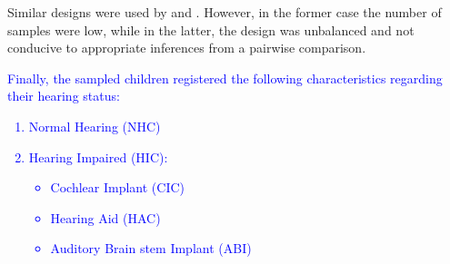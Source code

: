 Similar designs were used by \citet{Boonen_et_al_2020} and \citet{Faes_et_al_2021}. However, in the former case the number of samples were low, while in the latter, the design was unbalanced and not conducive to appropriate inferences from a pairwise comparison.

\textcolor{blue}{ Finally, the sampled children registered the following characteristics regarding their hearing status:
%
\begin{enumerate}
	\item Normal Hearing (NHC)
	\item Hearing Impaired (HIC):
	\begin{itemize}
		\item Cochlear Implant (CIC) 
		\item Hearing Aid (HAC) 
		\item Auditory Brain stem Implant (ABI)
	\end{itemize}
\end{enumerate}
}

\begin{comment}
\textbf{for the experimenter:} Based on \citet{Faes_et_al_2021} we depict the procedure for the experimenter:
%
\begin{enumerate}
	\item 1. matching procedure 
	\item selection of suitable stimuli
	\item determine the number of stimuli per judge 
	\item 
\end{enumerate}

about matching procedure \citep{Faes_et_al_2021}:
NH children were matched on gender, age and regional background, to the other two groups.Based on the previous NH kids were not representative of the NH population. 
Question: How they were matched?, Propensity Score Matching or manual work?. 
Age in NH at least has to be matched with "hearing age" in other groups, i.e. the length of use of the hearing device. However is still not completely appropriate. "lexical age", i.e. vocabulary size, is another matching measure (see p. 14 in \citep{Faes_et_al_2021} for more) 

\end{comment}
%
%
